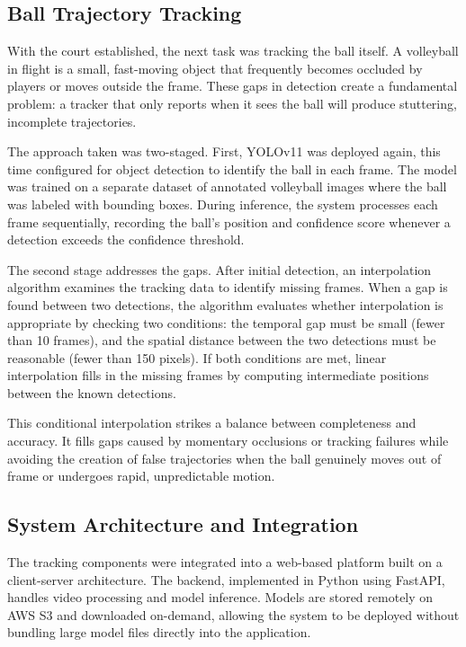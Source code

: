 \subsection{Ball Trajectory Tracking}

With the court established, the next task was tracking the ball itself. A volleyball in flight is a small, fast-moving object that frequently becomes occluded by players or moves outside the frame. These gaps in detection create a fundamental problem: a tracker that only reports when it sees the ball will produce stuttering, incomplete trajectories.

The approach taken was two-staged. First, YOLOv11 was deployed again, this time configured for object detection to identify the ball in each frame. The model was trained on a separate dataset of annotated volleyball images where the ball was labeled with bounding boxes. During inference, the system processes each frame sequentially, recording the ball's position and confidence score whenever a detection exceeds the confidence threshold.

The second stage addresses the gaps. After initial detection, an interpolation algorithm examines the tracking data to identify missing frames. When a gap is found between two detections, the algorithm evaluates whether interpolation is appropriate by checking two conditions: the temporal gap must be small (fewer than 10 frames), and the spatial distance between the two detections must be reasonable (fewer than 150 pixels). If both conditions are met, linear interpolation fills in the missing frames by computing intermediate positions between the known detections.

This conditional interpolation strikes a balance between completeness and accuracy. It fills gaps caused by momentary occlusions or tracking failures while avoiding the creation of false trajectories when the ball genuinely moves out of frame or undergoes rapid, unpredictable motion.

\subsection{System Architecture and Integration}

The tracking components were integrated into a web-based platform built on a client-server architecture. The backend, implemented in Python using FastAPI, handles video processing and model inference. Models are stored remotely on AWS S3 and downloaded on-demand, allowing the system to be deployed without bundling large model files directly into the application.

